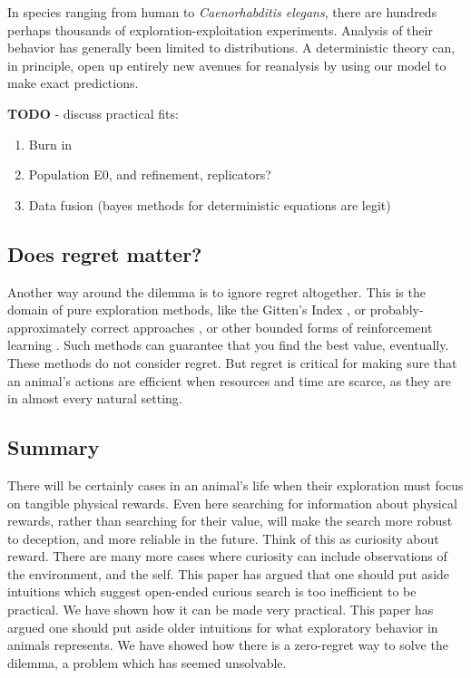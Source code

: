 In species ranging from human to \textit{Caenorhabditis elegans}, there are hundreds perhaps thousands of exploration-exploitation experiments. Analysis of their behavior has generally been limited to distributions. A deterministic theory can, in principle, open up entirely new avenues for reanalysis by using our model to make exact predictions.

\textbf{TODO} - discuss practical fits:
\begin{enumerate}
    \item Burn in
    \item Population E0, and refinement, replicators?
    \item Data fusion (bayes methods for deterministic equations are legit)
\end{enumerate}


\subsection*{Does regret matter?}
Another way around the dilemma is to ignore regret altogether. This is the domain of pure exploration methods, like the Gitten’s Index \cite{needed}, or probably-approximately correct approaches \cite{Valiant1984}, or other bounded forms of reinforcement learning \cite{needed}. Such methods can guarantee that you find the best value, eventually. These methods do not consider regret. But regret is critical for making sure that an animal's actions are efficient when resources and time are scarce, as they are in almost every natural setting. 


\subsection*{Summary}
There will be certainly cases in an animal's life when their exploration must focus on tangible physical rewards. Even here searching for information about physical rewards, rather than searching for their value, will make the search more robust to deception, and more reliable in the future. Think of this as curiosity about reward. There are many more cases where curiosity can include observations of the environment, and the self. This paper has argued that one should put aside intuitions which suggest open-ended curious search is too inefficient to be practical. We have shown how it can be made very practical. This paper has argued one should put aside older intuitions for what exploratory behavior in animals represents. We have showed how there is a zero-regret way to solve the dilemma, a problem which has seemed unsolvable.